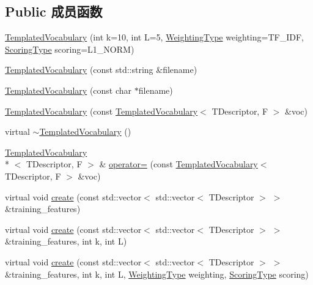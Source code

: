 \subsection*{Public 成员函数}
\begin{DoxyCompactItemize}
\item 
\hyperlink{classDBoW2_1_1TemplatedVocabulary_a0dbbcb6bf766b09f08d945a2af0dbea8}{Templated\-Vocabulary} (int k=10, int L=5, \hyperlink{namespaceDBoW2_a5de5c8a307aca9a84ffefda2a9bc467a}{Weighting\-Type} weighting=T\-F\-\_\-\-I\-D\-F, \hyperlink{namespaceDBoW2_aa252a592dd607c6e60dede06ceef2722}{Scoring\-Type} scoring=L1\-\_\-\-N\-O\-R\-M)
\item 
\hyperlink{classDBoW2_1_1TemplatedVocabulary_a72fc6a164a5174003d19bd3c54615de6}{Templated\-Vocabulary} (const std\-::string \&filename)
\item 
\hyperlink{classDBoW2_1_1TemplatedVocabulary_a255d68e7b4235487f8d2d8ea0cbaf43a}{Templated\-Vocabulary} (const char $\ast$filename)
\item 
\hyperlink{classDBoW2_1_1TemplatedVocabulary_aac48ee5331b5d88a4db1a3c93cb0f6a5}{Templated\-Vocabulary} (const \hyperlink{classDBoW2_1_1TemplatedVocabulary}{Templated\-Vocabulary}$<$ T\-Descriptor, F $>$ \&voc)
\item 
virtual \hyperlink{classDBoW2_1_1TemplatedVocabulary_a9d15f985a0c3badc1518be0fbe663099}{$\sim$\-Templated\-Vocabulary} ()
\item 
\hyperlink{classDBoW2_1_1TemplatedVocabulary}{Templated\-Vocabulary}\\*
$<$ T\-Descriptor, F $>$ \& \hyperlink{classDBoW2_1_1TemplatedVocabulary_a5355c25b6f37c11acffe48996e19323f}{operator=} (const \hyperlink{classDBoW2_1_1TemplatedVocabulary}{Templated\-Vocabulary}$<$ T\-Descriptor, F $>$ \&voc)
\item 
virtual void \hyperlink{classDBoW2_1_1TemplatedVocabulary_a3679b5a8f2043021a4faab99ccfe4ebe}{create} (const std\-::vector$<$ std\-::vector$<$ T\-Descriptor $>$ $>$ \&training\-\_\-features)
\item 
virtual void \hyperlink{classDBoW2_1_1TemplatedVocabulary_a94d48231b043a1102af4c35e256f2054}{create} (const std\-::vector$<$ std\-::vector$<$ T\-Descriptor $>$ $>$ \&training\-\_\-features, int k, int L)
\item 
virtual void \hyperlink{classDBoW2_1_1TemplatedVocabulary_a1e4a3e90f4aa1e6b6ea4d7491c223fd4}{create} (const std\-::vector$<$ std\-::vector$<$ T\-Descriptor $>$ $>$ \&training\-\_\-features, int k, int L, \hyperlink{namespaceDBoW2_a5de5c8a307aca9a84ffefda2a9bc467a}{Weighting\-Type} weighting, \hyperlink{namespaceDBoW2_aa252a592dd607c6e60dede06ceef2722}{Scoring\-Type} scoring)

\end{DoxyCompactItemize}
